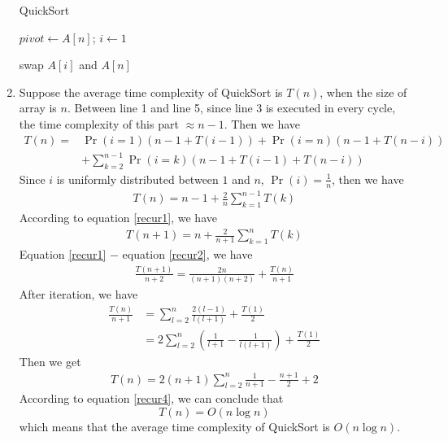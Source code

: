 \documentclass[12pt,a4paper,UTF8]{article}
\makeatletter
\newtheorem*{solution}{Solution}
\theoremstyle{definition}
\renewenvironment{solution}[1][Solution] {\par\pushQED{\qed}\normalfont\topsep6\p@\@plus6\p@\relax\trivlist\item[\hskip\labelsep\bfseries#1\@addpunct{.}]\ignorespaces}{\popQED\endtrivlist\@endpefalse} \makeatother
\makeatother
\begin{document}
\begin{enumerate}
\begin{minipage}[t]{0.8\textwidth}
\begin{algorithm}[H]
      \BlankLine
      \caption{QuickSort}\label{Alg_Quick}


      $pivot \leftarrow A[n]$; $i \leftarrow 1$\;

      swap $A[i]$ and $A[n]$\;
    \end{algorithm}
    \end{minipage}

    \begin{solution}
        Suppose the average time complexity of QuickSort is $T(n)$, when the size of array is $n$. Between line 1 and line 5, since line 3 is executed in every cycle, the time complexity of this part $\approx n - 1$. Then we have
        \begin{align*}
         T(n) = &\Pr(i = 1)(n-1 + T(i-1)) + \Pr(i = n)(n-1 + T(n - i))\\ &+ \sum_{k = 2}^{n-1} \Pr(i=k)(n-1+T(i-1)+T(n - i))
        \end{align*}
        Since $i$ is uniformly distributed between $1$ and $n$, $\Pr(i) = \frac{1}{n} $, then we have
        \begin{align}\label{recur1}
        T(n) = n-1 + \frac{2}{n} \sum_{k=1}^{n-1}T(k)
        \end{align}
        According to equation \ref{recur1}, we have
        \begin{align}\label{recur2}
        T(n+1) = n + \frac{2}{n+1} \sum_{k=1}^{n}T(k)
        \end{align}
        Equation \ref{recur1} $-$ equation \ref{recur2}, we have
        \begin{align}\label{recur3}
        \frac{T(n+1)}{n+2} = \frac{2n}{(n+1)(n+2)} + \frac{T(n)}{n+1}
        \end{align}
        After iteration, we have
        \begin{align*}
        \frac{T(n)}{n+1} &= \sum_{l=2}^{n}\frac{2(l-1)}{l(l+1)} + \frac{T(1)}{2}\\
        &= 2\sum_{l=2}^{n}(\frac{1}{l+1} - \frac{1}{l(l+1)}) + \frac{T(1)}{2}
        \end{align*}
        Then we get
        \begin{align}\label{recur4}
        T(n) = 2(n+1)\sum_{l=2}^{n}\frac{1}{n+1} - \frac{n+1}{2} + 2
        \end{align}
        According to equation \ref{recur4}, we can conclude that 
        $$ T(n) = O(n\log n)$$
        which means that the average time complexity of QuickSort is $ O(n\log n) $.
    \end{solution}


\end{enumerate}
\end{document}
